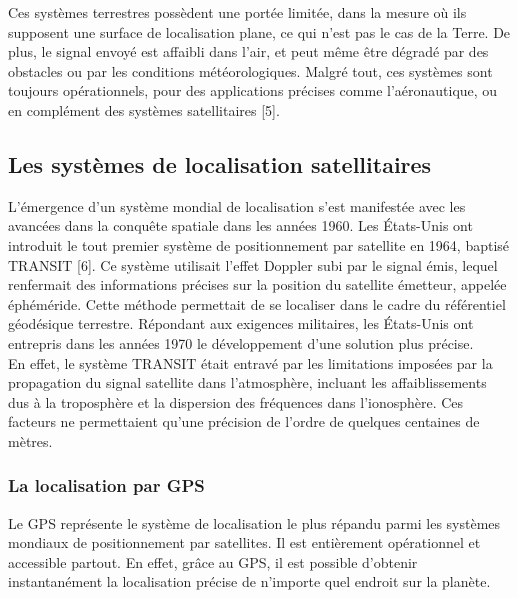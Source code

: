Ces systèmes terrestres possèdent une portée limitée, dans la mesure où ils supposent une surface de localisation plane, ce qui n’est pas le cas de la Terre. De plus, le signal envoyé est affaibli dans l’air, et peut même être dégradé par des obstacles ou par les conditions météorologiques. Malgré tout, ces systèmes sont toujours opérationnels, pour des applications précises comme l’aéronautique, ou en complément des systèmes satellitaires [5].

\subsection{ Les systèmes de localisation satellitaires}
L'émergence d'un système mondial de localisation s'est manifestée avec les avancées dans la conquête spatiale dans les années 1960. Les États-Unis ont introduit le tout premier système de positionnement par satellite en 1964, baptisé TRANSIT [6]. Ce système utilisait l'effet Doppler subi par le signal émis, lequel renfermait des informations précises sur la position du satellite émetteur, appelée éphéméride. Cette méthode permettait de se localiser dans le cadre du référentiel géodésique terrestre. Répondant aux exigences militaires, les États-Unis ont entrepris dans les années 1970 le développement d'une solution plus précise. \\

En effet, le système TRANSIT était entravé par les limitations imposées par la propagation du signal satellite dans l'atmosphère, incluant les affaiblissements dus à la troposphère et la dispersion des fréquences dans l'ionosphère. Ces facteurs ne permettaient qu'une précision de l'ordre de quelques centaines de mètres.

\subsubsection{La localisation par GPS}
Le GPS représente le système de localisation le plus répandu parmi les systèmes mondiaux de positionnement par satellites. Il est entièrement opérationnel et accessible partout. En effet, grâce au GPS, il est possible d'obtenir instantanément la localisation précise de n'importe quel endroit sur la planète.

